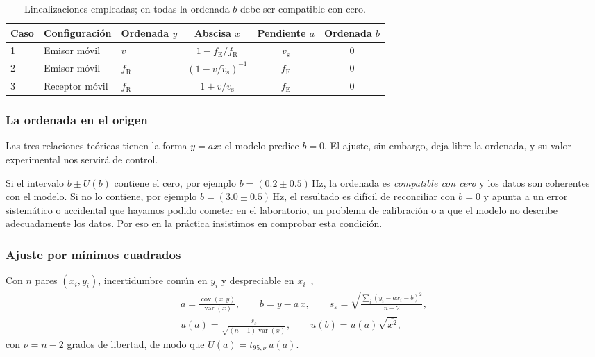 \documentclass[a4paper,11pt]{amsart}
\numberwithin{equation}{section}
\newcommand{\vs}{v_{\mathrm{s}}}              %
\newcommand{\vst}{\tilde{v}_{\mathrm{s}}}     %
\newcommand{\fE}{f_{\mathrm{E}}}              %
\newcommand{\fR}{f_{\mathrm{R}}}              %
\newcommand{\ext}[1]{U(#1)}                   %
\newcommand{\mean}[1]{\overline{#1}}
\DeclareMathOperator{\var}{var}
\DeclareMathOperator{\cov}{cov}
\theoremstyle{cienplano}
\theoremstyle{ciendef}
\theoremstyle{cienobs}
\begin{document}
\begin{table}[ht]
\centering
\caption{Linealizaciones empleadas; en todas la ordenada $b$ debe ser compatible con cero.}
\label{tab:ajustes}
\small
\renewcommand{\arraystretch}{1.3}
\begin{tabular}{@{}lllccc@{}}
\toprule
Caso & Configuración & Ordenada $y$ & Abscisa $x$ & Pendiente $a$ & Ordenada $b$\\
\midrule
1 & Emisor móvil & $v$ & $1-\fE/\fR$ & $\vs$ & $0$\\
2 & Emisor móvil & $\fR$ & $(1-v/\vst)^{-1}$ & $\fE$ & $0$\\
3 & Receptor móvil & $\fR$ & $1+v/\vst$ & $\fE$ & $0$\\
\bottomrule
\end{tabular}
\end{table}

\subsubsection{La ordenada en el origen}
Las tres relaciones teóricas tienen la forma $y=ax$: el modelo predice $b=0$.
El ajuste, sin embargo, deja libre la ordenada, y su valor experimental nos servirá
de control.

Si el intervalo $b\pm\ext{b}$ contiene el cero, por ejemplo
$b=(\num{0,2}\pm\num{0,5})\,\si{\hertz}$, la ordenada es \emph{compatible con
cero} y los datos son coherentes con el modelo. Si no lo contiene, por ejemplo
$b=(\num{3,0}\pm\num{0,5})\,\si{\hertz}$, el resultado es difícil de reconciliar
con $b=0$ y apunta a un error sistemático o accidental que hayamos podido cometer en el laboratorio, un problema de calibración o a que el
modelo no describe adecuadamente los datos. Por eso en la práctica insistimos en
comprobar esta condición.

\subsubsection{Ajuste por mínimos cuadrados}
Con $n$ pares $(x_i,y_i)$, incertidumbre común en $y_i$ y despreciable en
$x_i$~\cite{NUM-ARG},
\begin{equation}\label{eq:ajuste}
\begin{gathered}
  a=\frac{\cov(x,y)}{\var(x)},\qquad b=\mean{y}-a\,\mean{x},\qquad
  s_\varepsilon=\sqrt{\frac{\sum_i(y_i-ax_i-b)^{2}}{n-2}},\\[4pt]
  u(a)=\frac{s_\varepsilon}{\sqrt{(n-1)\var(x)}},\qquad
  u(b)=u(a)\sqrt{\mean{x^{2}}},
\end{gathered}
\end{equation}
con $\nu=n-2$ grados de libertad, de modo que $\ext{a}=t_{95,\nu}\,u(a)$.
\end{document}
